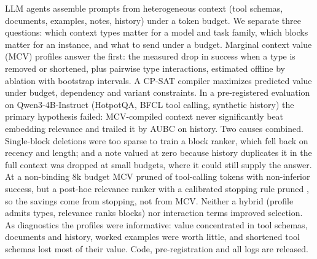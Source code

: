 LLM agents assemble prompts from heterogeneous context (tool schemas, documents, examples, notes, history) under a
token budget. We separate three questions: which context types matter for a model and task family, which blocks matter
for an instance, and what to send under a budget. Marginal context value (MCV) profiles answer the first: the measured
drop in success when a type is removed or shortened, plus pairwise type interactions, estimated offline by ablation with
bootstrap intervals. A CP-SAT compiler maximizes predicted value under budget, dependency
and variant constraints. In a pre-registered evaluation on Qwen3-4B-Instruct (HotpotQA, BFCL tool calling, synthetic
history) the primary hypothesis failed: MCV-compiled context never significantly beat embedding relevance and trailed it
by \RHOneHistoryAbs{} AUBC on history. Two causes combined. Single-block deletions were too sparse to train a block
ranker, which fell back on recency and length; and a note valued at zero because history duplicates it in the full
context was dropped at small budgets, where it could still supply the answer. At a non-binding 8k budget MCV pruned
\RTokCutTool of tool-calling tokens with non-inferior success, but a post-hoc relevance ranker with a calibrated stopping
rule pruned \RTokCutStopTool, so the savings come from stopping, not from MCV. Neither a hybrid (profile admits types,
relevance ranks blocks) nor interaction terms improved selection. As diagnostics the
profiles were informative: value concentrated in tool schemas, documents and history, worked examples were worth little, and
shortened tool schemas lost most of their value. Code, pre-registration and all logs are released.
